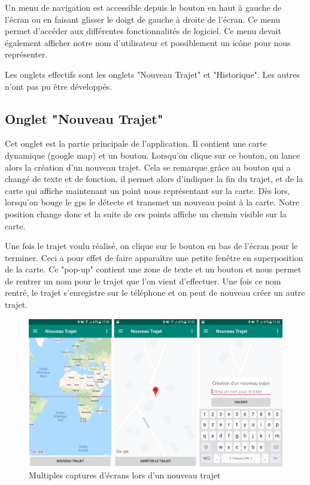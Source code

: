 Un menu de navigation est accessible depuis le bouton en haut à gauche de l'écran ou en faisant glisser le doigt de gauche à droite de l'écran.
Ce menu permet d'accéder aux différentes fonctionnalités de logiciel. Ce menu devait également afficher notre nom d'utilisateur et
possiblement un icône pour nous représenter.

Les onglets effectifs sont les onglets "Nouveau Trajet" et "Historique". Les autres n'ont pas pu être développés.

\subsection{Onglet "Nouveau Trajet"}
Cet onglet est la partie principale de l'application. Il contient une carte dynamique (google map) et un bouton. Lorsqu'on clique sur ce
bouton, on lance alors la création d'un nouveau trajet. Cela se remarque grâce au bouton qui a changé de texte et de fonction, il permet
alors d'indiquer la fin du trajet, et de la carte qui affiche maintenant un point nous représentant sur la carte. Dès lors, lorsqu'on bouge
le gps le détecte et transmet un nouveau point à la carte. Notre position change donc et la suite de ces points affiche un chemin visible
sur la carte.

Une fois le trajet voulu réalisé, on clique sur le bouton en bas de l'écran pour le terminer. Ceci a pour effet de faire apparaître une
petite fenêtre en superposition de la carte. Ce "pop-up" contient une zone de texte et un bouton et nous permet de rentrer un nom pour
le trajet que l'on vient d'effectuer. Une fois ce nom rentré, le trajet s'enregistre sur le téléphone et on peut de nouveau créer un
autre trajet.
\begin{figure}[ht]
  \label{Nouveau trajet}
  \centering
  \includegraphics[scale=0.11]{images/nouveau-trajet.png}
  \caption{Multiples captures d'écrans lors d'un nouveau trajet}
\end{figure}

